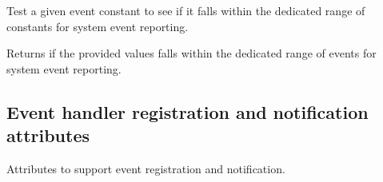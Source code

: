 Test a given event constant to see if it falls within the dedicated range of constants for system event reporting.


\begin{arglist}
\end{arglist}

Returns  if the provided values falls within the dedicated range of events for system event reporting.

\subsection{Event handler registration and notification attributes}
\label{api:struct:attributes:event}

Attributes to support event registration and notification.

